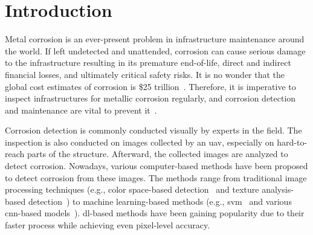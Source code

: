 \documentclass[mathematics,article,submit,pdftex,moreauthors]{Definitions/mdpi}
\begin{document}
\section{Introduction}

Metal corrosion is an ever-present problem in infrastructure maintenance around the world. If left undetected
and unattended, corrosion can cause serious damage to the infrastructure
resulting in its premature end-of-life,
direct and indirect financial losses, 
and ultimately critical safety risks. It 
is no wonder that the global cost estimates of
corrosion is \$25 trillion~\cite{Koch2016}.
Therefore, it is imperative to
inspect infrastructures for metallic corrosion
regularly, and corrosion detection and maintenance
are vital to prevent it~\cite{Wang2019}.

Corrosion detection is commonly conducted 
visually by experts in the field. The inspection is 
also conducted on images collected by an \ac{uav}, especially
on hard-to-reach parts of the structure.
Afterward, the collected images are analyzed to detect
corrosion. Nowadays, various computer-based
methods have been proposed to detect corrosion
from these images. The methods range from
traditional image processing techniques
(e.g., color space-based detection~\cite{Igoe2016} 
and texture analysis-based detection~\cite{Pascual2014})
to machine learning-based methods (e.g.,
\ac{svm}~\cite{Chen2012} and various 
\ac{cnn}-based models~\cite{Nash2022, Liu2023}).
\Ac{dl}-based methods have been gaining 
popularity due to their faster process while achieving
even pixel-level accuracy. 
\end{document}
